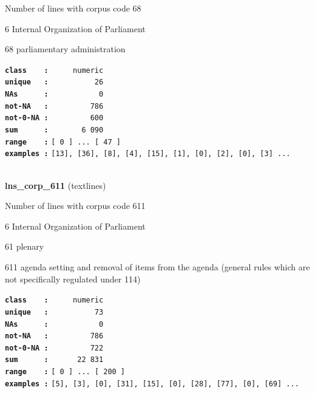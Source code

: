 \documentclass[]{article}
\begin{document}
Number of lines with corpus code 68

6 Internal Organization of Parliament

68 parliamentary administration

\textbf{\texttt{class\ \ \ \ :}} \texttt{~~~~~numeric}\\
\textbf{\texttt{unique\ \ \ :}} \texttt{~~~~~~~~~~26}\\
\textbf{\texttt{NAs\ \ \ \ \ \ :}} \texttt{~~~~~~~~~~~0}\\
\textbf{\texttt{not-NA\ \ \ :}} \texttt{~~~~~~~~~786}\\
\textbf{\texttt{not-0-NA\ :}} \texttt{~~~~~~~~~600}\\
\textbf{\texttt{sum\ \ \ \ \ \ :}} \texttt{~~~~~~~6~090}\\
\textbf{\texttt{range\ \ \ \ :}}
\texttt{{[}\ 0\ {]}\ ...\ {[}\ 47\ {]}}\\
\textbf{\texttt{examples\ :}}
\texttt{{[}13{]},\ {[}36{]},\ {[}8{]},\ {[}4{]},\ {[}15{]},\ {[}1{]},\ {[}0{]},\ {[}2{]},\ {[}0{]},\ {[}3{]}\ ...}\\

~

\textbf{lns\_corp\_611} (textlines)

Number of lines with corpus code 611

6 Internal Organization of Parliament

61 plenary

611 agenda setting and removal of items from the agenda (general rules
which are not specifically regulated under 114)

\textbf{\texttt{class\ \ \ \ :}} \texttt{~~~~~numeric}\\
\textbf{\texttt{unique\ \ \ :}} \texttt{~~~~~~~~~~73}\\
\textbf{\texttt{NAs\ \ \ \ \ \ :}} \texttt{~~~~~~~~~~~0}\\
\textbf{\texttt{not-NA\ \ \ :}} \texttt{~~~~~~~~~786}\\
\textbf{\texttt{not-0-NA\ :}} \texttt{~~~~~~~~~722}\\
\textbf{\texttt{sum\ \ \ \ \ \ :}} \texttt{~~~~~~22~831}\\
\textbf{\texttt{range\ \ \ \ :}}
\texttt{{[}\ 0\ {]}\ ...\ {[}\ 200\ {]}}\\
\textbf{\texttt{examples\ :}}
\texttt{{[}5{]},\ {[}3{]},\ {[}0{]},\ {[}31{]},\ {[}15{]},\ {[}0{]},\ {[}28{]},\ {[}77{]},\ {[}0{]},\ {[}69{]}\ ...}\\

~
\end{document}
